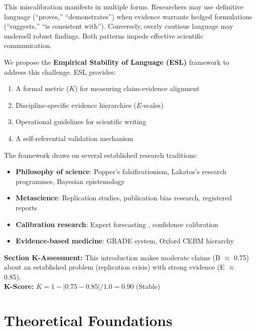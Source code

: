 \documentclass[11pt,a4paper]{article}
\begin{document}
This miscalibration manifests in multiple forms. Researchers may use
definitive language (``proves,'' ``demonstrates'') when evidence warrants
hedged formulations (``suggests,'' ``is consistent with''). Conversely,
overly cautious language may undersell robust findings. Both patterns
impede effective scientific communication.

We propose the \textbf{Empirical Stability of Language (ESL)} framework
to address this challenge. ESL provides:

\begin{enumerate}
    \item A formal metric ($K$) for measuring claim-evidence alignment
    \item Discipline-specific evidence hierarchies ($E$-scales)
    \item Operational guidelines for scientific writing
    \item A self-referential validation mechanism
\end{enumerate}

The framework draws on several established research traditions:

\begin{itemize}
    \item \textbf{Philosophy of science}: Popper's falsificationism,
    Lakatos's research programmes, Bayesian epistemology
    \item \textbf{Metascience}: Replication studies, publication bias
    research, registered reports
    \item \textbf{Calibration research}: Expert forecasting
    \citep{Tetlock2015}, confidence calibration
    \item \textbf{Evidence-based medicine}: GRADE system, Oxford CEBM
    hierarchy
\end{itemize}

\begin{eslbox}
\textbf{Section K-Assessment:} This introduction makes moderate claims
(B $\approx$ 0.75) about an established problem (replication crisis)
with strong evidence (E $\approx$ 0.85). \\
\textbf{K-Score:} $K = 1 - |0.75 - 0.85| / 1.0 = 0.90$ (Stable)
\end{eslbox}

\section{Theoretical Foundations}
\end{document}
